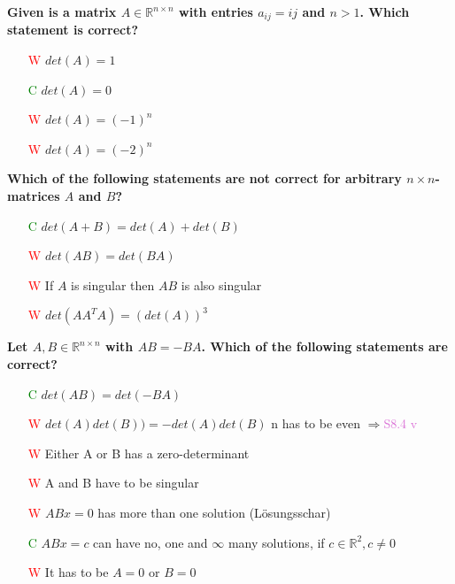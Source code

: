 \documentclass[7pt,landscape, margin = 0.1mm]{article}
\begin{document}
\begin{multicols}{4}
\begin{flushleft}
\textbf{ Given is a matrix $A  \in \mathbb{R}^{n \times n} $ with entries $a_{ij} = ij$ and $n > 1$. Which statement is correct?  }
\begin{itemize}
\item[\textcolor{red}{W}]  $det(A) = 1 $
\item[\textcolor{green}{C}]  $det(A) = 0 $
\item[\textcolor{red}{W}]  $det(A) = (-1)^n $
\item[\textcolor{red}{W}]  $det(A) = (-2)^n $
\end{itemize}
\hspace{3mm}

\textbf{ Which of the following statements are not correct for arbitrary $n \times n$-matrices $A$ and $B$? }
\begin{itemize}
\item[\textcolor{green}{C}]  $det(A+B) = det(A)+det(B) $
\item[\textcolor{red}{W}] $det(AB) = det(BA) $
\item[\textcolor{red}{W}] If $ A$ is singular then $AB$ is also singular
\item[\textcolor{red}{W}]  $det(AA^TA) =(det(A))^3$
\end{itemize}
\hspace{3mm}


\textbf{Let $A,B  \in \mathbb{R}^{n \times n} $ with $AB =-BA $. Which of the following statements are correct?}
\begin{itemize}
\item[\textcolor{green}{C}] $det(AB) = det(-BA) $
\item[\textcolor{red}{W}] $det(A)det(B)) = - det(A)det(B)$
\textcolor{Emerald}{n has to be even $\Rightarrow $\textcolor{Orchid}{S8.4 v}}
\item[\textcolor{red}{W}] Either A or B has a zero-determinant
\item[\textcolor{red}{W}] A and B have to be singular
\item[\textcolor{red}{W}] $ABx=0$ has more than one solution (Lösungsschar)
\item[\textcolor{green}{C}] $ABx=c$ can have no, one and $\infty$ many solutions, if $c \in \mathbb{R}^2, c\neq 0$
\item[\textcolor{red}{W}] It has to be $A=0$ or $B=0$

\end{itemize}


\hspace{3mm}



\end{flushleft}
\end{multicols}
\end{document}
